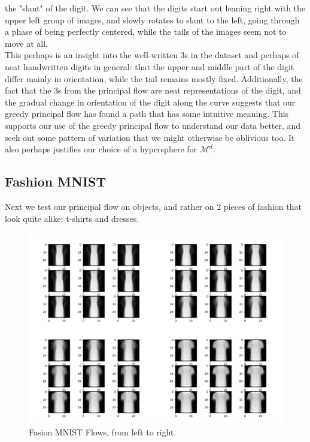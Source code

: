 \documentclass[12pt]{report}
\begin{document}
the "slant" of the digit. We can see that the digits start out 
leaning right with the upper left group of images,  and slowly rotates
to slant to the left, going through a phase of being perfectly centered, while the
tails of the images seem not to move at all. \\
This perhaps is an insight into the well-written 3s in the dataset and perhaps 
of neat handwritten digits in general: that the upper and middle part of the
digit differ mainly in orientation, while the tail remains mostly fixed.
Additionally, the fact that the 3s from the principal flow 
are neat representations of the digit, and the gradual change in
orientation of the digit along the curve suggests that our 
greedy principal flow has found a path that has some intuitive meaning.
This supports our use of the greedy principal flow to understand
our data better, and seek out some pattern of variation
that we might otherwise be oblivious too.
It also perhaps justifies our choice of a hypersphere for $\mathcal{M}^d$.

\iffalse
\subsection{Fashion MNIST}

Next we test our principal flow on objects, and rather on 2 pieces of fashion that
look quite alike: t-shirts and dresses.

\begin{figure}[ht]
    \begin{center}
        \includegraphics[scale=0.2]{main_fashion.png}
        \caption{Fasion MNIST Flows, from left to right.}
        \label{fig:fashionmnistflows}
    \end{center}
\end{figure}
\end{document}
